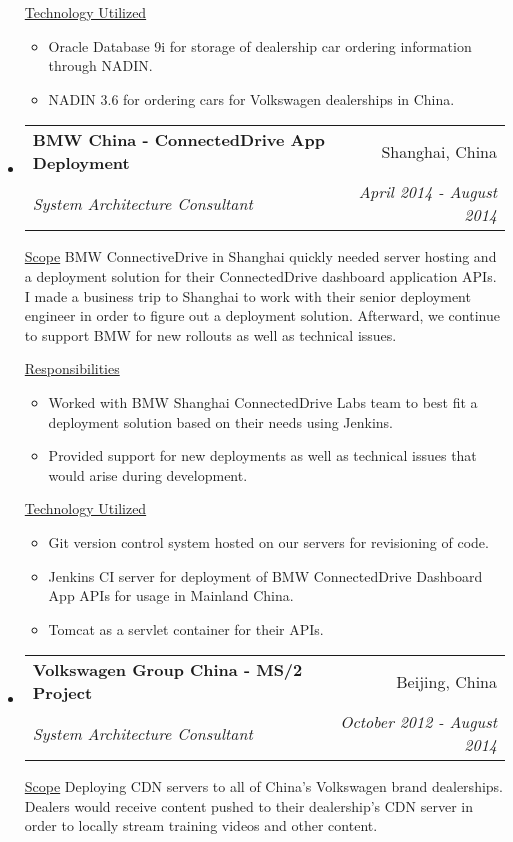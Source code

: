 \documentclass[a4paper,11pt]{article}
\makeatletter
\newcommand{\resitem}[1]{\item #1 \vspace{-2pt}}
\newcommand{\ressubheading}[4]{
\begin{tabular*}{6.5in}{l@{\cftdotfill{\cftsecdotsep}\extracolsep{\fill}}r}
		\textbf{#1} & #2 \\
		\textit{#3} & \textit{#4} \\
\end{tabular*}\vspace{-6pt}}
\makeatother
\begin{document}
\begin{itemize}
		\underline{Technology Utilized}
		\begin{itemize}
			\resitem{Oracle Database 9i for storage of dealership car ordering information through NADIN.}
			\resitem{NADIN 3.6 for ordering cars for Volkswagen dealerships in China.}
		\end{itemize}

	\item
		\ressubheading{BMW China - ConnectedDrive App Deployment}{Shanghai, China}{System Architecture Consultant}{April 2014 - August 2014}
		\linebreak
		\linebreak

		\underline{Scope}
		\linebreak
		\linebreak
		BMW ConnectiveDrive in Shanghai quickly needed server hosting and a deployment solution for their ConnectedDrive dashboard application APIs. I made a business trip to Shanghai to work with their senior deployment engineer in order to figure out a deployment solution. Afterward, we continue to support BMW for new rollouts as well as technical issues.

		\underline{Responsibilities}
		\begin{itemize}
			\resitem{Worked with BMW Shanghai ConnectedDrive Labs team to best fit a deployment solution based on their needs using Jenkins.}
			\resitem{Provided support for new deployments as well as technical issues that would arise during development.}
		\end{itemize}

		\underline{Technology Utilized}
		\begin{itemize}
			\resitem{Git version control system hosted on our servers for revisioning of code.}
			\resitem{Jenkins CI server for deployment of BMW ConnectedDrive Dashboard App APIs for usage in Mainland China.}
			\resitem{Tomcat as a servlet container for their APIs.}
		\end{itemize}

	\item
		\ressubheading{Volkswagen Group China - MS/2 Project}{Beijing, China}{System Architecture Consultant}{October 2012 - August 2014}
		\linebreak
		\linebreak
		
		\underline{Scope}
		\linebreak
		\linebreak
		Deploying CDN servers to all of China's Volkswagen brand dealerships. Dealers would receive content pushed to their dealership's CDN server in order to locally stream training videos and other content.
		

\end{itemize}
\end{document}
